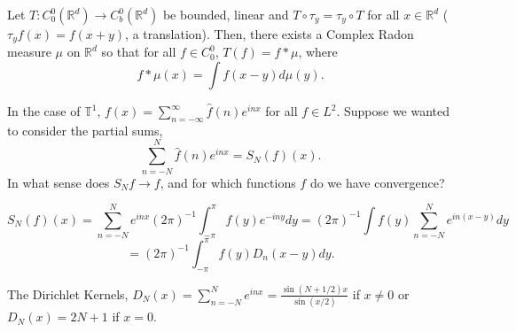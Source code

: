\documentclass[11pt]{scrartcl}
\newcommand{\R}{\mathbb{R}}
\newcommand{\T}{\mathbb T}
\let \hat \widehat
\newcommand{\<}{\langle}
\renewcommand{\>}{\rangle}
\begin{document}
Let $T : C_0^0(\R^d) \rightarrow C_b^0(\R^d)$ be bounded, linear and $T \circ \tau_y  = \tau_y \circ T$ for all $x \in \R^d$ ($\tau_y f(x) = f(x + y)$, a translation).  Then, there exists a Complex Radon measure $\mu$ on $\R^d$ so that for all $f \in C_{0}^0$, $T(f) = f * \mu$, where 
$$f * \mu(x) = \int f(x-y) d\mu(y).$$

In the case of $\T^1$, $f(x) = \sum_{n = -\infty}^{\infty} \hat{f}(n) e^{inx}$ for all $f \in L^2$. Suppose we wanted to consider the partial sums, 
$$\sum_{n  = -N}^N \hat{f}(n)e^{inx} = S_N(f)(x).$$
In what sense does $S_N f \rightarrow f$, and for which functions $f$ do we have convergence?

$$S_N(f)(x) = \sum_{n = -N}^N e^{inx}(2\pi)^{-1}\int_{-\pi}^{\pi} f(y)e^{-iny}dy = (2\pi)^{-1} \int f(y) \sum_{n = -N}^N e^{in(x-y)} dy$$
$$= (2\pi)^{-1} \int_{-\pi}^{\pi} f(y) D_n(x-y)dy.$$

The Dirichlet Kernels, $D_N(x) = \sum_{n = -N}^N e^{inx} = \frac{\sin{(N+1/2)x}}{\sin{(x/2)}}$ if $x \ne 0$ or $D_N(x) = 2N+1$ if $x = 0$.
\end{document}
